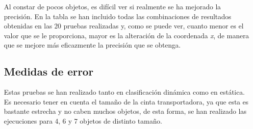 \noindent Al constar de pocos objetos, es difícil ver si realmente se ha mejorado la precisión. En la tabla se han incluido todas las combinaciones de resultados obtenidas en las 20 pruebas realizadas y, como se puede ver, cuanto menor es el valor que se le proporciona, mayor es la alteración de la coordenada \textit{x}, de manera que se mejore más eficazmente la precisión que se obtenga. \\

\subsection{Medidas de error}
\noindent Estas pruebas se han realizado tanto en clasificación dinámica como en estática. Es necesario tener en cuenta el tamaño de la cinta transportadora, ya que esta es bastante estrecha y no caben muchos objetos, de esta forma, se han realizado las ejecuciones para 4, 6 y 7 objetos de distinto tamaño.\\

